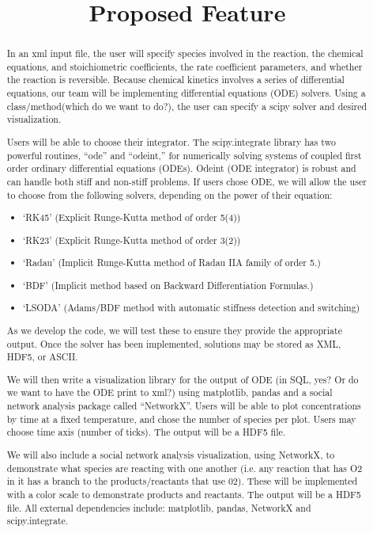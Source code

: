 \documentclass[preprint,12pt]{elsarticle}
\begin{document}
\begin{frontmatter}


\title{Proposed Feature
}

\address{Group 4}

\begin{abstract}
In an xml input file, the user will specify species involved in the reaction, the chemical equations, and stoichiometric coefficients, the rate coefficient parameters, and whether the reaction is reversible. Because chemical kinetics involves a series of differential equations, our team will be implementing differential equations (ODE) solvers. Using a class/method(which do we want to do?), the user can specify a scipy solver and desired visualization.

Users will be able to choose their integrator. The scipy.integrate library has two powerful routines, “ode” and “odeint,” for numerically solving systems of coupled first order ordinary differential equations (ODEs). Odeint (ODE integrator) is robust and can handle both stiff and non-stiff problems. If users chose ODE, we will allow the user to choose from the following solvers, depending on the power of their equation: 

\begin{itemize}
\item ‘RK45’ (Explicit Runge-Kutta method of order 5(4))
\item ‘RK23’ (Explicit Runge-Kutta method of order 3(2)) 
\item ‘Radau’ (Implicit Runge-Kutta method of Radau IIA family of order 5.)
\item ‘BDF’ (Implicit method based on Backward Differentiation Formulas.)
\item ‘LSODA’ (Adams/BDF method with automatic stiffness detection and switching) 
\end{itemize}

As we develop the code, we will test these to ensure they provide the appropriate output. Once the solver has been implemented, solutions may be stored as XML, HDF5, or ASCII. 


We will then write a visualization library for the output of ODE (in SQL, yes? Or do we want to have the ODE print to xml?) using matplotlib, pandas and a social network analysis package called “NetworkX”. Users will be able to plot concentrations by time at a fixed temperature, and chose the number of species per plot. Users may choose time axis (number of ticks). The output will be a HDF5 file. 

We will also include a social network analysis visualization, using NetworkX, to demonstrate what species are reacting with one another (i.e. any reaction that has O2 in it has a branch to the products/reactants that use 02). These will be implemented with a color scale to demonstrate products and reactants. The output will be a HDF5 file. 
All external dependencies include: matplotlib, pandas, NetworkX and scipy.integrate.

\end{abstract}


\end{frontmatter}
\end{document}
